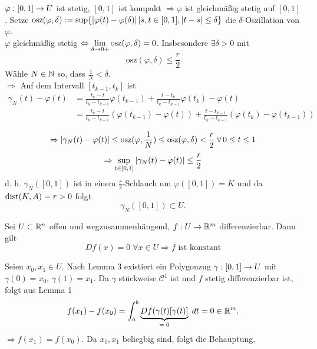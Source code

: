 \documentclass[../ana2.tex]{subfiles}
\begin{document}
\begin{bew}
    \begin{bew}\renewcommand{\qedsymbol}{}
        \(\abb{\varphi}{[0,1]}{U}\) ist stetig, 
        \( [0,1] \) ist kompakt \( \Rightarrow 
        \varphi \) ist gleichmäßig stetig auf 
        \( [0,1] \).
        Setze \(\mathrm{osz}(\varphi, \delta) := \sup 
        \set{\abs{\varphi(t)- \varphi(\delta)} \vert s,t \in [0,1], \abs{t-s} \leq \delta}\)
        die \(\delta\)-Oszillation von \( \varphi \).\\
        \( \varphi \) gleichmäßig stetig 
        \( \Leftrightarrow \limesx{\delta}{0+} 
        \mathrm{osz}(\varphi, \delta) = 0 \).
        Insbesondere \(\exists \delta > 0\) mit
        \[ \mathrm{osz}(\varphi, \delta) \leq \frac{r}{2} \]
        Wähle \(N \in \N\) so, dass \(\frac{1}{N} < \delta\).\\
        \( \Rightarrow \) Auf dem Intervall 
        \( [t_{k-1}, t_k] \) ist
        \begin{align*}
            \gamma_N(t) - \varphi(t) 
            &= \frac{t_{k} - t}{t_k - t_{k-1}}\varphi(t_{k-1})
            + \frac{ t - t_k }{ t_k - t_{k-1} }\varphi(t_k) 
            - \varphi(t) \\
            &= \frac{ t_k - t }{t_k - t_{k-1}} (\varphi(t_{k-1}) - \varphi(t)) 
            + \frac{ t - t_{k-1} }{t_k - t_{k-1}}(\varphi(t_k) - \varphi(t_{k-1}))
        \end{align*}
        
        \[ \Rightarrow \abs{\gamma_N(t) - \varphi(t)} 
        \leq \mathrm{osz}(\varphi, \frac{1}{N})
        \leq \mathrm{osz}(\varphi, \delta) < \frac{r}{2} 
        \; \forall 0 \leq t \leq 1 \]
        \[ \Rightarrow \underset{t \in [0,1]}{\sup} 
        \abs{\gamma_N(t)-\varphi(t)} \leq \frac{r}{2} \]
        d. h. \( \gamma_N([0,1]) \) ist in einem \(\frac{r}{2}\)-Schlauch um
        \(\varphi([0,1]) = K\) und da \(\dist(K,A) = r > 0\) folgt
        \[ \gamma_N([0,1]) \subset U. \]        
    \end{bew}
\end{bew}
\begin{satz}
    Sei \(U \subset \R^n\) offen und wegzusammenhängend,
    \( \abb{f}{U}{\R^m} \) differenzierbar. Dann gilt
    \[ Df(x) = 0 \; \forall x \in U \Rightarrow f \text{ ist konstant} \]
\end{satz}
\begin{bew}
    Seien \(x_0, x_1 \in U\). Nach Lemma 3 existiert ein Polygonzug
    \( \abb{\gamma}{[0,1]}{U} \) mit \( \gamma(0) = x_0 \), 
    \( \gamma(1) = x_1 \).
    Da \( \gamma \) stückweise \(\mathcal{C}^1\) ist und \(f\) stetig
    differenzierbar ist, folgt aus Lemma 1 
    \[ f(x_1)-f(x_0) = \integralx{\underbrace{Df(\gamma(t)[\gamma(t)]}_{=\; 0}}{a}{b}{t} 
    = 0 \in \R^m. \]
    \( \Rightarrow f(x_1) = f(x_0) \). Da \( x_0, x_1 \) beliegbig sind, 
    folgt die Behauptung.
\end{bew}
\end{document}
